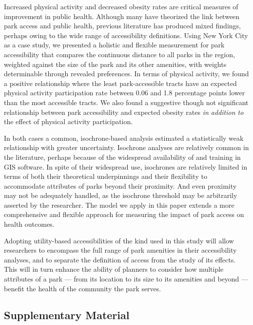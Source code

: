 \documentclass[shortAfour,sageh.bst]{sagej}
\begin{document}
Increased physical activity and decreased obesity rates are critical
measures of improvement in public health. Although many have theorized
the link between park access and public health, previous literature has
produced mixed findings, perhaps owing to the wide range of
accessibility definitions. Using New York City as a case study, we
presented a holistic and flexible measurement for park accessibility
that compares the continuous distance to all parks in the region,
weighted against the size of the park and its other amenities, with
weights determinable through revealed preferences. In terms of physical
activity, we found a positive relationship where the least
park-accessible tracts have an expected physical activity participation
rate between 0.06 and 1.8 percentage points lower than the most
accessible tracts. We also found a suggestive though not significant
relationship between park accessibility and expected obesity rates
\emph{in addition to} the effect of physical activity participation.

In both cases a common, isochrone-based analysis estimated a
statistically weak relationship with greater uncertainty. Isochrone
analyses are relatively common in the literature, perhaps because of the
widespread availability of and training in GIS software. In spite of
their widespread use, isochrones are relatively limited in terms of both
their theoretical underpinnings and their flexibility to accommodate
attributes of parks beyond their proximity. And even proximity may not
be adequately handled, as the isochrone threshold may be arbitrarily
asserted by the researcher. The model we apply in this paper extends a
more comprehensive and flexible approach for measuring the impact of
park access on health outcomes.

Adopting utility-based accessibilities of the kind used in this study
will allow researchers to encompass the full range of park amenities in
their accessibility analyses, and to separate the definition of access
from the study of its effects. This will in turn enhance the ability of
planners to consider how multiple attributes of a park --- from its
location to its size to its amenities and beyond --- benefit the health
of the community the park serves.

\begin{acks}
\end{acks}





\hypertarget{appendix}{%
\subsection{Supplementary Material}\label{appendix}}
\setcounter{table}{0}
\renewcommand{\thetable}{S\arabic{table}}
\end{document}
